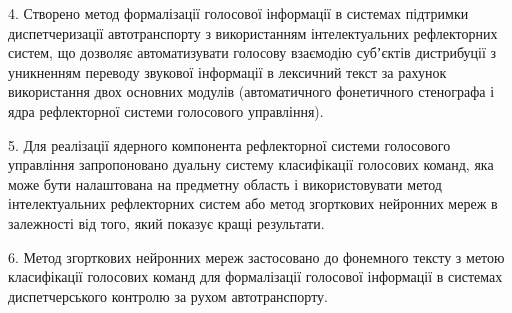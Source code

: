 
4. Створено метод формалізації голосової інформації в системах підтримки диспетчеризації автотранспорту з використанням інтелектуальних рефлекторних систем, що дозволяє автоматизувати голосову взаємодію субʼєктів дистрибуції з уникненням переводу звукової інформації в лексичний текст за рахунок використання двох основних модулів (автоматичного фонетичного стенографа і ядра рефлекторної системи голосового управління).


5. Для реалізації ядерного компонента рефлекторної системи голосового управління запропоновано дуальну систему класифікації голосових команд, яка може бути налаштована на предметну область і використовувати метод інтелектуальних рефлекторних систем або метод згорткових нейронних мереж в залежності від того, який показує кращі результати.

6. Метод згорткових нейронних мереж застосовано до фонемного тексту з метою класифікації голосових команд для формалізації голосової інформації в системах диспетчерського контролю за рухом автотранспорту.



